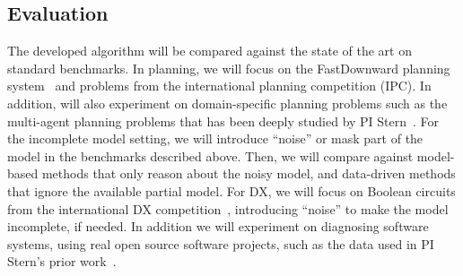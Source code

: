 \documentclass[12pt]{article}
\begin{document}


\subsection{Evaluation}
\label{sec:evaluation}

The developed algorithm will be compared against the state of the art on standard benchmarks. In planning, 
we will focus on the FastDownward planning system~\cite{helmert2006fast} and problems from the international planning competition (IPC). 
In addition, will also experiment on domain-specific planning problems such as the multi-agent planning problems that has been deeply studied by PI Stern~\cite{sharon2013increasing,sharon2015conflict,boyarski2015icbs,boyrasky2015dont,maliah2016collaborative}. 
For the incomplete model setting, we will introduce ``noise'' or mask part of the model in the benchmarks described above. Then, we will compare against model-based methods that only reason about the noisy model, and data-driven methods that ignore the available partial model. For DX, we will focus on Boolean circuits from the international DX competition~\cite{poll2011third}, introducing ``noise'' to make the model incomplete, if needed. In addition we will experiment on diagnosing software systems, using real open source software projects, such as the data used in PI Stern's prior work~\cite{elmishali2016dataAugmented}. 

\end{document}
